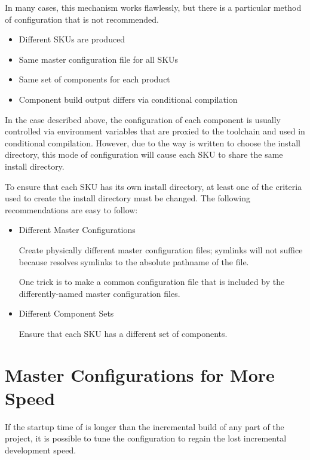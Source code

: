 In many cases, this mechanism works flawlessly, but there is a
particular method of configuration that is not recommended.

\begin{itemize}
\item{Different SKUs are produced}
\item{Same master configuration file for all SKUs}
\item{Same set of components for each product}
\item{Component build output differs via conditional compilation}
\end{itemize}

In the case described above, the configuration of each component is
usually controlled via environment variables that are proxied to the
toolchain and used in conditional compilation.  However, due to the
way \lmsbw is written to choose the install directory, this mode of
configuration will cause each SKU to share the same install directory.

To ensure that each SKU has its own install directory, at least one of
the criteria used to create the install directory must be changed.
The following recommendations are easy to follow:

\begin{itemize}
\item Different Master Configurations

  Create physically different master configuration files; symlinks
  will not suffice because \lmsbw resolves symlinks to the absolute
  pathname of the file.

  One trick is to make a common configuration file that is included by
  the differently-named master configuration files.

\item{Different Component Sets}

  Ensure that each SKU has a different set of components.
\end{itemize}

\section{Master Configurations for More Speed}

If the startup time of \lmsbw is longer than the incremental build of
any part of the project, it is possible to tune the configuration to
regain the lost incremental development speed.

